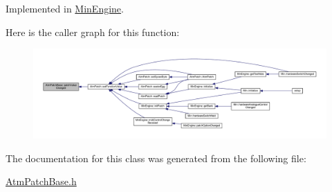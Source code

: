 Implemented in \hyperlink{class_min_engine_a229d4b913277a48909bf1aa01176ae1f}{Min\+Engine}.

Here is the caller graph for this function\+:
\nopagebreak
\begin{figure}[H]
\begin{center}
\leavevmode
\includegraphics[width=350pt]{class_atm_patch_base_ad561145330e0b53990f222c243ef5e89_icgraph}
\end{center}
\end{figure}


The documentation for this class was generated from the following file\+:\begin{DoxyCompactItemize}
\item 
\hyperlink{_atm_patch_base_8h}{Atm\+Patch\+Base.\+h}\end{DoxyCompactItemize}

